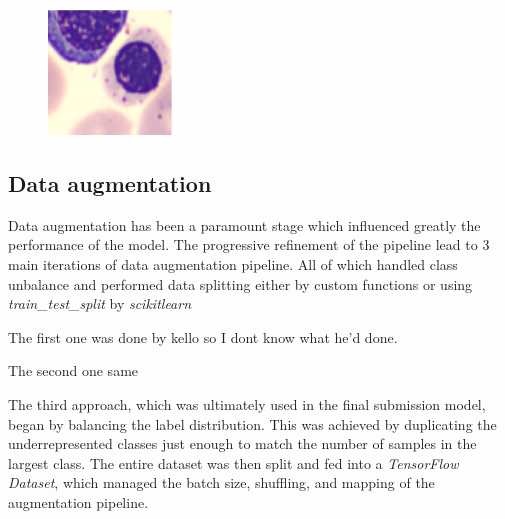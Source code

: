 \documentclass[11pt]{article}
\begin{document}
\begin{figure}[H]
\begin{minipage}{0.2\textwidth}
        \includegraphics[width=\linewidth]{images/ambiguous2.png}
    \end{minipage}
\end{figure}

\subsection{Data augmentation}

Data augmentation has been a paramount stage which influenced greatly the performance of the model. The progressive refinement of the pipeline lead to 3 main iterations of data augmentation pipeline.
All of which handled class unbalance and performed data splitting either by custom functions or using \textit{train\_test\_split} by \textit{scikit\-learn}

The first one was done by kello so I dont know what he'd done.

The second one same

The third approach, which was ultimately used in the final submission model, began by balancing the label distribution. This was achieved by duplicating the underrepresented classes just enough to match the number of samples in the largest class. The entire dataset was then split and fed into a \textit{TensorFlow Dataset}, which managed the batch size, shuffling, and mapping of the augmentation pipeline.
\end{document}
